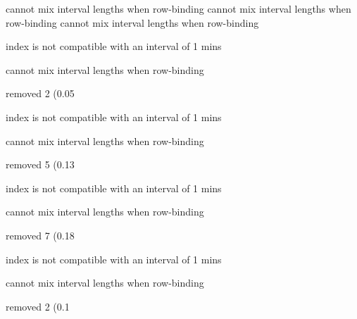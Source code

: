 \documentclass[
]{jss}
\begin{document}
\begin{CodeChunk}
\begin{CodeOutput}
cannot mix interval lengths when row-binding
cannot mix interval lengths when row-binding
cannot mix interval lengths when row-binding
\end{CodeOutput}

\begin{CodeOutput}
index is not compatible with an interval of 1 mins
\end{CodeOutput}

\begin{CodeOutput}
cannot mix interval lengths when row-binding
\end{CodeOutput}

\begin{CodeOutput}
removed 2 (0.05%
\end{CodeOutput}

\begin{CodeOutput}
index is not compatible with an interval of 1 mins
\end{CodeOutput}

\begin{CodeOutput}
cannot mix interval lengths when row-binding
\end{CodeOutput}

\begin{CodeOutput}
removed 5 (0.13%
\end{CodeOutput}

\begin{CodeOutput}
index is not compatible with an interval of 1 mins
\end{CodeOutput}

\begin{CodeOutput}
cannot mix interval lengths when row-binding
\end{CodeOutput}

\begin{CodeOutput}
removed 7 (0.18%
\end{CodeOutput}

\begin{CodeOutput}
index is not compatible with an interval of 1 mins
\end{CodeOutput}

\begin{CodeOutput}
cannot mix interval lengths when row-binding
\end{CodeOutput}

\begin{CodeOutput}
removed 2 (0.1%
\end{CodeOutput}


\end{CodeChunk}
\end{document}
